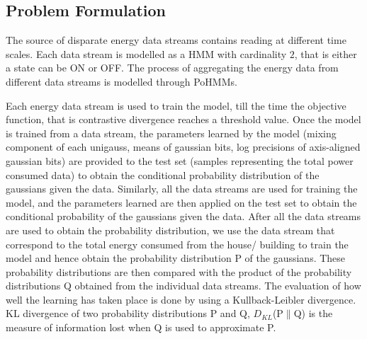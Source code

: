 \documentclass{sig-alternate}
\begin{document}
\subsection{Problem Formulation}
The source of disparate energy data streams contains reading at different time scales. Each data stream is modelled as a HMM with cardinality $2$, that is either a state can be ON or OFF. The process of aggregating the energy data from different data streams is modelled through PoHMMs. 

Each energy data stream is used to train the model, till the time the objective function, that is contrastive divergence reaches a threshold value. Once the model is trained from a data stream, the parameters learned by the model (mixing component of each unigauss, means of gaussian bits, log precisions of axis-aligned gaussian bits) are provided to the test set (samples representing the total power consumed data) to obtain the conditional probability distribution of the gaussians given the data. Similarly, all the data streams are used for training the model, and the parameters learned are then applied on the test set to obtain the conditional probability of the gaussians given the data. After all the data streams are used to obtain the probability distribution, we use the data stream that correspond to the total energy consumed from the house/ building to train the model and hence obtain the probability distribution P of the gaussians. These probability distributions are then compared with the product of the probability distributions Q obtained from the individual data streams. The evaluation of how well the learning has taken place is done by using a Kullback-Leibler divergence. KL divergence of two probability distributions P and Q, $D_{KL}$(P$\parallel$Q) is the measure of information lost when Q is used to approximate P. %
\end{document}
